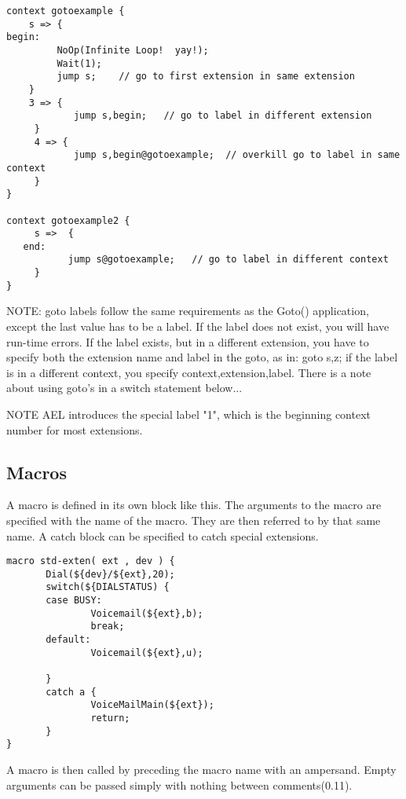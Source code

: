 {\begin{astlisting}
\begin{verbatim}
context gotoexample {
    s => {
begin:
         NoOp(Infinite Loop!  yay!);
         Wait(1);
         jump s;    // go to first extension in same extension
    }
    3 => {
            jump s,begin;   // go to label in different extension
     }
     4 => {
            jump s,begin@gotoexample;  // overkill go to label in same context
     }
}

context gotoexample2 {
     s =>  {
   end:
           jump s@gotoexample;   // go to label in different context
     }
}
\end{verbatim}
\end{astlisting}

NOTE: goto labels follow the same requirements as the Goto()
      application, except the last value has to be a label. If the
      label does not exist, you will have run-time errors. If the
      label exists, but in a different extension, you have to specify
      both the extension name and label in the goto, as in: goto s,z;
      if the label is in a different context, you specify
      context,extension,label. There is a note about using goto's in a
      switch statement below...

NOTE  AEL introduces the special label "1", which is the beginning
      context number for most extensions.


\subsection{Macros}

A macro is defined in its own block like this. The arguments to the
macro are specified with the name of the macro. They are then referred
to by that same name. A catch block can be specified to catch special
extensions.

\begin{astlisting}
\begin{verbatim}
macro std-exten( ext , dev ) {
       Dial(${dev}/${ext},20);
       switch(${DIALSTATUS) {
       case BUSY:
               Voicemail(${ext},b);
               break;
       default:
               Voicemail(${ext},u);

       }
       catch a {
               VoiceMailMain(${ext});
               return;
       }
}
\end{verbatim}
\end{astlisting}

A macro is then called by preceding the macro name with an
ampersand. Empty arguments can be passed simply with nothing between
comments(0.11).

}
